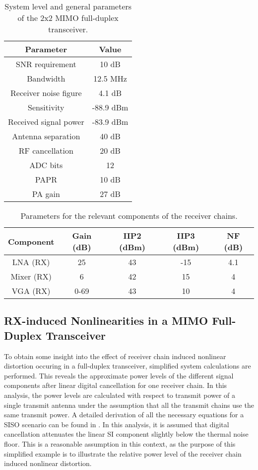 \documentclass[conference,twoside,letterpaper,10pt]{IEEEtran}
\begin{document}
\begin{table}[!t]
\renewcommand{\arraystretch}{1.3}
\caption{System level and general parameters of the 2x2 MIMO full-duplex transceiver.}
\label{table:system_parameters}
\centering
\begin{tabular}{|c||c|}
\hline
\textbf{Parameter} & Value\\
\hline
SNR requirement & 10 dB \\
\hline
Bandwidth & 12.5 MHz\\
\hline
Receiver noise figure & 4.1 dB\\
\hline
Sensitivity & -88.9 dBm\\
\hline
Received signal power & -83.9 dBm\\
\hline
Antenna separation & 40 dB\\
\hline
RF cancellation & 20 dB\\
\hline
ADC bits & 12\\
\hline
PAPR & 10 dB\\
\hline
PA gain & 27 dB\\
\hline
\end{tabular}
\end{table}

\begin{table}[!t]
\renewcommand{\arraystretch}{1.3}
\caption{Parameters for the relevant components of the receiver chains.}
\label{table:parameters}
\centering
\begin{tabular}{|c||c||c||c||c|}
\hline
\textbf{Component} & \textbf{Gain (dB)} & \textbf{IIP2 (dBm)} & \textbf{IIP3 (dBm)} & \textbf{NF (dB)}\\
\hline
LNA (RX) & 25& 43 & -15 & 4.1\\
\hline
Mixer (RX)& 6 & 42 & 15 & 4\\
\hline
VGA (RX) & 0-69 & 43 & 10 & 4\\
\hline\end{tabular}
\end{table}

\subsection{RX-induced Nonlinearities in a MIMO Full-Duplex Transceiver}

To obtain some insight into the effect of receiver chain induced nonlinear distortion occuring in a full-duplex transceiver, simplified system calculations are performed. This reveals the approximate power levels of the different signal components after linear digital cancellation for one receiver chain. In this analysis, the power levels are calculated with respect to transmit power of a single transmit antenna under the assumption that all the transmit chains use the same transmit power. A detailed derivation of all the necessary equations for a SISO scenario can be found in \cite{Korpi13}. In this analysis, it is assumed that digital cancellation attenuates the linear SI component slightly below the thermal noise floor. This is a reasonable assumption in this context, as the purpose of this simplified example is to illustrate the relative power level of the receiver chain induced nonlinear distortion.
\end{document}
